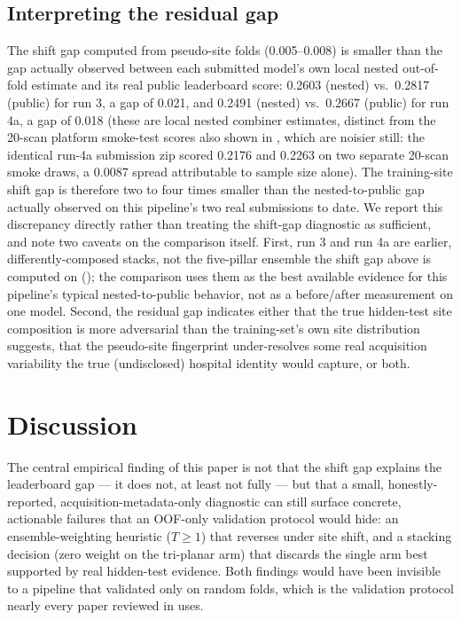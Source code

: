 \documentclass[11pt]{article}
\begin{document}
\subsection{Interpreting the residual gap}

The shift gap computed from pseudo-site folds (0.005--0.008) is smaller than the gap actually observed between each submitted model's own local nested out-of-fold estimate and its real public leaderboard score: 0.2603 (nested) vs.\ 0.2817 (public) for run 3, a gap of 0.021, and 0.2491 (nested) vs.\ 0.2667 (public) for run 4a, a gap of 0.018 (these are local nested combiner estimates, distinct from the 20-scan platform smoke-test scores also shown in , which are noisier still: the identical run-4a submission zip scored 0.2176 and 0.2263 on two separate 20-scan smoke draws, a 0.0087 spread attributable to sample size alone). The training-site shift gap is therefore two to four times smaller than the nested-to-public gap actually observed on this pipeline's two real submissions to date. We report this discrepancy directly rather than treating the shift-gap diagnostic as sufficient, and note two caveats on the comparison itself. First, run 3 and run 4a are earlier, differently-composed stacks, not the five-pillar ensemble the shift gap above is computed on (); the comparison uses them as the best available evidence for this pipeline's typical nested-to-public behavior, not as a before/after measurement on one model. Second, the residual gap indicates either that the true hidden-test site composition is more adversarial than the training-set's own site distribution suggests, that the pseudo-site fingerprint under-resolves some real acquisition variability the true (undisclosed) hospital identity would capture, or both.

\section{Discussion}
\label{sec:discussion}

The central empirical finding of this paper is not that the shift gap explains the leaderboard gap --- it does not, at least not fully --- but that a small, honestly-reported, acquisition-metadata-only diagnostic can still surface concrete, actionable failures that an OOF-only validation protocol would hide: an ensemble-weighting heuristic ($T \geq 1$) that reverses under site shift, and a stacking decision (zero weight on the tri-planar arm) that discards the single arm best supported by real hidden-test evidence. Both findings would have been invisible to a pipeline that validated only on random folds, which is the validation protocol nearly every paper reviewed in  uses.
\end{document}
